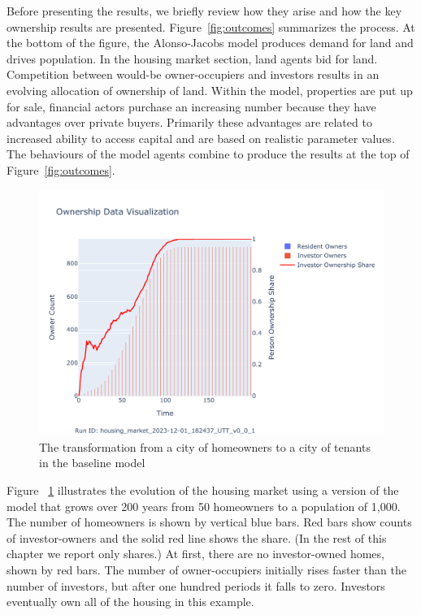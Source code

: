 Before presenting the results, we briefly review how they arise and how the key ownership results are presented. 
Figure~\ref{fig:outcomes} summarizes the process. %
At the bottom of the figure, the \gls{Alonso-Jacobs model} produces demand for land and drives population. In the housing market section, land agents bid for land. Competition between would-be owner-occupiers and investors results in an evolving allocation of ownership of land. Within the model, properties are put up for sale, financial actors purchase an increasing number because they have advantages over private buyers. Primarily these advantages are related to increased ability to access capital and are based on realistic parameter values. The behaviours of the model agents combine to produce the results at the top of Figure~\ref{fig:outcomes}. 

\begin{figure}[h!tb]
    \centering
    \hspace{4cm} %
    \includegraphics[scale=0.8, trim={0 1cm 0 1.8cm}, clip]{fig/Analysis/Ownership_Data_1.pdf}
    \caption{The transformation from a city of homeowners to a city of tenants in the baseline model}
    \label{fig:Baseline_ownership_trajectory}
\end{figure}


Figure ~\ref{fig:Baseline_ownership_trajectory} illustrates the evolution of the housing market using a version of the model that grows over 200 years from 50 homeowners to a population of 1,000. The number of homeowners is shown by vertical blue bars.  Red bars show counts of investor-owners and the solid red line shows the share. (In the rest of this chapter we report only shares.) 
At first, there are no investor-owned homes, shown by red bars. The number of owner-occupiers initially rises faster than the number of investors, but after one hundred periods it falls to zero. Investors eventually own all of the housing in this example. 
 
